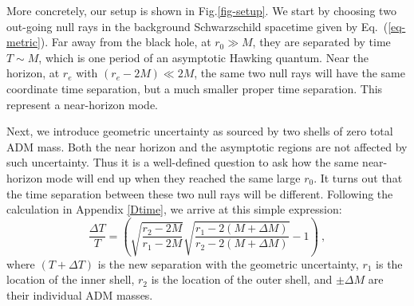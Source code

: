 \documentclass[aps,showpacs,onecolumn,floats,prd,superscriptaddress,nofootinbib]{revtex4-1}
\begin{document}
More concretely, our setup is shown in Fig.\ref{fig-setup}. 
We start by choosing two out-going null rays in the background Schwarzschild spacetime given by Eq.~(\ref{eq-metric}).
Far away from the black hole, at $r_0\gg M$, they are separated by time $T \sim M$, which is one period of an asymptotic Hawking quantum.
Near the horizon, at $r_e$ with $(r_e-2M)\ll 2M$, the same two null rays will have the same coordinate time separation, but a much smaller proper time separation.
This represent a near-horizon mode.

Next, we introduce geometric uncertainty as sourced by two shells of zero total ADM mass.
Both the near horizon and the asymptotic regions are not affected by such uncertainty.
Thus it is a well-defined question to ask how the same near-horizon mode will end up when they reached the same large $r_0$. 
It turns out that the time separation between these two null rays will be different. 
Following the calculation in Appendix \ref{Dtime}, we arrive at this simple expression:
\begin{equation}
\frac{\Delta T}{T} = 
\left(\sqrt{\frac{r_2-2M}{r_1-2M}}\sqrt{\frac{r_1-2(M+\Delta M)}{r_2-2(M+\Delta M)}}-1\right)~,
\label{eq-result}
\end{equation}
where $(T+\Delta T)$ is the new separation with the geometric uncertainty, $r_1$ is the location of the inner shell, $r_2$ is the location of the outer shell, and $\pm\Delta M$ are their individual ADM masses. 
\end{document}
